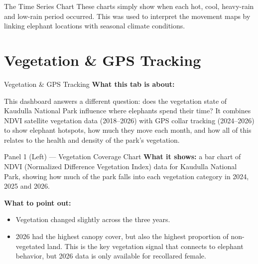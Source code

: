 \documentclass{beamer}
\begin{document}
	\begin{frame}{The Time Series Chart}
		\Large
		These charts simply show when each hot, cool, heavy-rain and low-rain period
		occurred. This was used to interpret the movement maps by linking elephant
		locations with seasonal climate conditions.
	\end{frame}
	
	
	
	
	
	
	\section{Vegetation \& GPS Tracking}
	
	\begin{frame}{Vegetation \& GPS Tracking}
		\Large
		\textbf{What this tab is about:}
		\vspace{4pt}
		
		This dashboard answers a different question: does the vegetation state of
		Kaudulla National Park influence where elephants spend their time? It
		combines NDVI satellite vegetation data (2018--2026) with GPS collar tracking
		(2024--2026) to show elephant hotspots, how much they move each month, and
		how all of this relates to the health and density of the park's vegetation.
	\end{frame}
	
	
	
	
	
	
	\begin{frame}{Panel 1 (Left) --- Vegetation Coverage Chart}
		\textbf{What it shows:} a bar chart of NDVI (Normalized Difference Vegetation
		Index) data for Kaudulla National Park, showing how much of the park falls
		into each vegetation category in 2024, 2025 and 2026.
		
		\vspace{4pt}
		
		
		\vspace{6pt}
		\textbf{What to point out:}
		\begin{itemize}
			\item Vegetation changed slightly across the three years.
			\item 2026 had the highest canopy cover, but also the highest proportion of
			non-vegetated land. This is the key vegetation signal that connects
			to elephant behavior, but 2026 data is only available for recollared
			female.
		\end{itemize}
	\end{frame}
	
\end{document}
